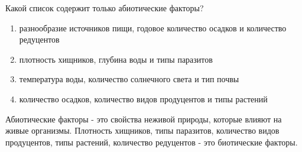 
Какой список содержит только абиотические факторы?

\begin{enumerate}
    \item разнообразие источников пищи, годовое количество осадков и количество редуцентов
    \item плотность хищников, глубина воды и типы паразитов
    \item температура воды, количество солнечного света и тип почвы
    \item количество осадков, количество видов продуцентов и типы растений
\end{enumerate}

\explanationSection

Абиотические факторы - это свойства неживой природы, которые влияют на живые организмы. Плотность хищников, типы паразитов, количество видов продуцентов, типы растений, количество редуцентов - это биотические факторы.

